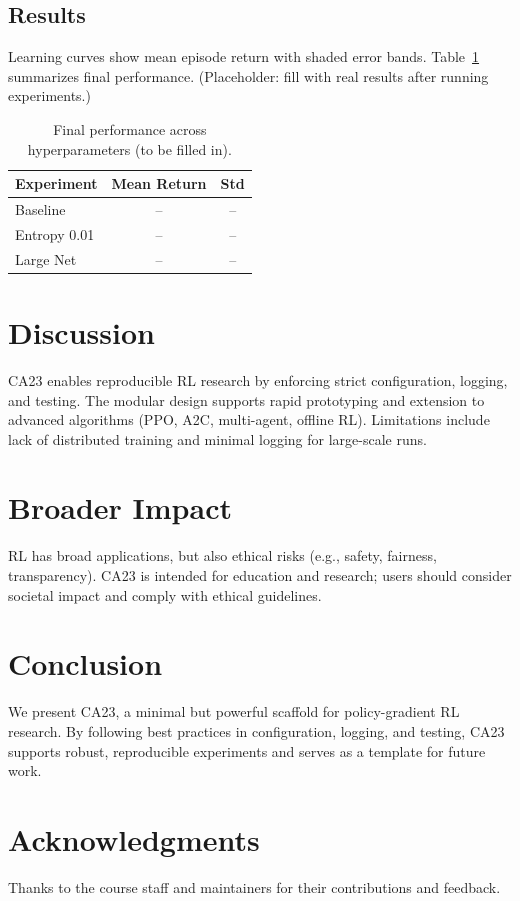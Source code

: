 \documentclass[conference]{IEEEtran}
\begin{document}
\subsection{Results}
Learning curves show mean episode return with shaded error bands. Table~\ref{tab:results} summarizes final performance. (Placeholder: fill with real results after running experiments.)

\begin{table}[h]
\centering
\begin{tabular}{@{}lcc@{}}\toprule
Experiment & Mean Return & Std \\ \midrule
Baseline & -- & -- \\
Entropy 0.01 & -- & -- \\
Large Net & -- & -- \\
\bottomrule
\end{tabular}
\caption{Final performance across hyperparameters (to be filled in).}
\label{tab:results}
\end{table}

\section{Discussion}
CA23 enables reproducible RL research by enforcing strict configuration, logging, and testing. The modular design supports rapid prototyping and extension to advanced algorithms (PPO, A2C, multi-agent, offline RL). Limitations include lack of distributed training and minimal logging for large-scale runs.

\section{Broader Impact}
RL has broad applications, but also ethical risks (e.g., safety, fairness, transparency). CA23 is intended for education and research; users should consider societal impact and comply with ethical guidelines.

\section{Conclusion}
We present CA23, a minimal but powerful scaffold for policy-gradient RL research. By following best practices in configuration, logging, and testing, CA23 supports robust, reproducible experiments and serves as a template for future work.

\section*{Acknowledgments}
Thanks to the course staff and maintainers for their contributions and feedback.
\end{document}
